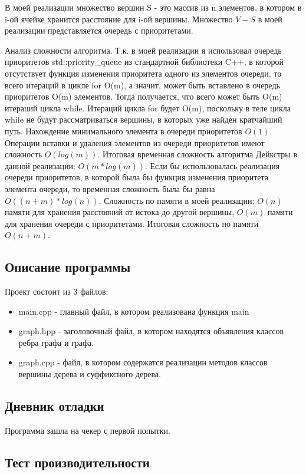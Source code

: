 \documentclass[12pt]{article}
\begin{document}
В моей реализации множество вершин S - это массив из n элементов, в котором в i-ой ячейке хранится расстояние для i-ой вершины. Множество $V - S$ в моей реализации представляется очередь с приоритетами.

Анализ сложности алгоритма. Т.к. в моей реализации я использовал очередь приоритетов std::priority\_queue из стандартной библиотеки C++, в которой отсутствует функция изменения приоритета одного из элементов очереди, то всего итераций в цикле for O(m), а значит, может быть вставлено в очередь приоритетов O(m) элементов. Тогда получается, что всего может быть O(m) итераций цикла while. Итераций цикла for будет O(m), поскольку в теле цикла while не будут рассматриваться вершины, в которых уже найден кратчайший путь.
Нахождение минимального элемента в очереди приоритетов $O(1)$. Операции вставки и удаления элементов из очереди приоритетов имеют сложность $O(log(m))$. Итоговая временная сложность алгоритма Дейкстры в данной реализации: $O(m * log(m))$. Если бы использовалась реализация очереди приоритетов, в которой была бы функция изменения приоритета элемента очереди, то временная сложность была бы равна $O((n + m) * log(n))$. Сложность по памяти в моей реализации: $O(n)$ памяти для хранения расстояний от истока до другой вершины, $O(m)$ памяти для хранения очереди с приоритетами. Итоговая сложность по памяти $O(n + m)$.


\subsection*{Описание программы}

Проект состоит из 3 файлов:
\begin{itemize}
    \item main.cpp - главный файл, в котором реализована функция main
    \item graph.hpp - заголовочный файл, в котором находятся объявления классов ребра графа и графа.
    \item graph.cpp - файл, в котором содержатся реализации методов классов вершины дерева и суффиксного дерева.
\end{itemize}
\subsection*{Дневник отладки}

Программа зашла на чекер с первой попытки.

\subsection*{Тест производительности}
\end{document}
